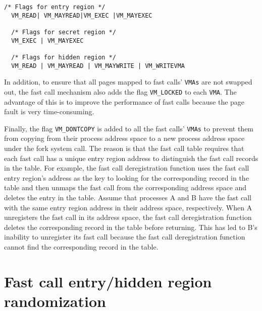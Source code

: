 \begin{lstlisting}[style=CStyle]
  /* Flags for entry region */
  VM_READ| VM_MAYREAD|VM_EXEC |VM_MAYEXEC

  /* Flags for secret region */
  VM_EXEC | VM_MAYEXEC

  /* Flags for hidden region */
  VM_READ | VM_MAYREAD | VM_MAYWRITE | VM_WRITEVMA
\end{lstlisting}


In addition, to ensure that all pages mapped to fast calls' \verb|VMAs| 
are not swapped out, the fast call mechanism also adds the flag \verb|VM_LOCKED|  
to each \verb|VMA|. The advantage of this is to improve the performance of 
fast calls because the page fault is very time-consuming.

Finally, the flag \verb|VM_DONTCOPY| is added to all the fast calls' \verb|VMAs| to prevent 
them from copying from their process address space to a new process address space 
under the fork system call. The reason is that the fast call table requires that each 
fast call has a unique entry region address to distinguish the fast call records in 
the table. For example, the fast call deregistration function uses the fast call entry 
region's address as the key to looking for the corresponding record in the table and then 
unmaps the fast call from the corresponding address space and deletes the entry in the table. 
Assume that processes A and B have the fast call with the same entry region address in their 
address space, respectively. When A unregisters the fast call in its address space, 
the fast call deregistration function deletes the corresponding record in the table 
before returning. This has led to B's inability to unregister its fast call because 
the fast call deregistration function cannot find the corresponding record in the table.


\section{Fast call entry/hidden region randomization}


